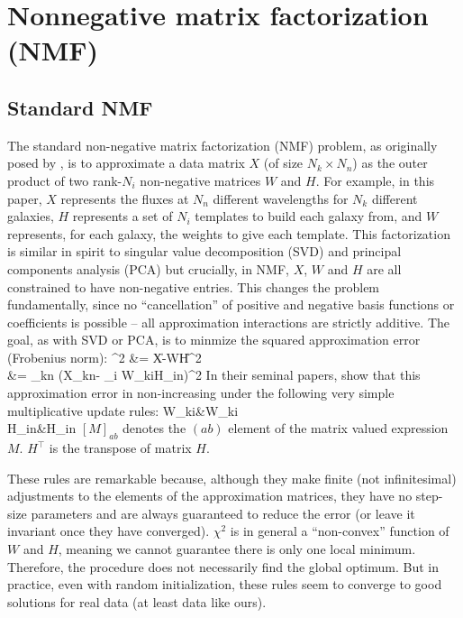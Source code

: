 \documentclass[10pt,preprint]{aastex}
\def\beqa#1\eeqa{\begin{align}#1\end{align}}
\newcommand{\T}{^{\scriptscriptstyle \top}}
\newcommand{\XX}{X}
\newcommand{\XXh}{\hat{X}}
\newcommand{\Xkn}{X_{kn}}
\newcommand{\WW}{W}
\newcommand{\Wki}{W_{ki}}
\newcommand{\HH}{H}
\newcommand{\Hin}{H_{in}}
\begin{document}

 

\appendix

\section{Nonnegative matrix factorization (NMF)}
\label{nmf}

\subsection{Standard NMF}
The standard non-negative matrix factorization (NMF) problem, as
originally posed by \cite{lee00a}, is to approximate a data
matrix $\XX$ (of size $N_k\times N_n$) as the outer product of two
rank-$N_i$ non-negative matrices $\WW$ and $\HH$. For example, in this
paper, $\XX$ represents the fluxes at $N_n$ different wavelengths for
$N_k$ different galaxies, $\HH$ represents a set of $N_i$ templates to build
each galaxy from, and $\WW$ represents, for each galaxy, the weights
to give each template. This factorization is similar in spirit to
singular value decomposition (SVD) and principal components analysis
(PCA) but crucially, in NMF, $\XX$, $\WW$ and $\HH$ are all
constrained to have non-negative entries. This changes the problem
fundamentally, since no ``cancellation'' of positive and negative
basis functions or coefficients is possible -- all approximation
interactions are strictly additive. The goal, as with SVD or PCA, is
to minmize the squared approximation error (Frobenius norm):
\beqa \label{eq:nmfcost}
\chi^2 &= \|\XX-\WW\HH\|^2\\
&= \sum_{kn} \left(\Xkn - \sum_i \Wki\Hin \right)^2
\eeqa
In their seminal papers, \cite{lee00a} show that this approximation
error in non-increasing under the following very simple multiplicative
update rules: 
\beqa \label{eq:wupdate}
\Wki &\leftarrow \Wki \frac{[\XX\HH\T]_{ki}}{[\WW\HH\HH\T]_{ki}}\\
\label{eq:hupdate}
\Hin &\leftarrow \Hin \frac{[\WW\T\XX]_{in}}{[\WW\T\WW\HH]_{in}}
\eeqa
$[M]_{ab}$ denotes the $(ab)$ element of the matrix valued expression
$M$. $\HH\T$ is the transpose of matrix $\HH$.

These rules are remarkable because, although they make finite (not
infinitesimal) adjustments to the elements of the approximation
matrices, they have no step-size parameters and are always guaranteed
to reduce the error (or leave it invariant once they have converged).
$\chi^2$ is in general a ``non-convex'' function of $\WW$ and $\HH$,
meaning we cannot guarantee there is only one local
minimum. Therefore, the procedure does not necessarily find the global
optimum. But in practice, even with random initialization, these rules
seem to converge to good solutions for real data (at least data like
ours).
\end{document}
